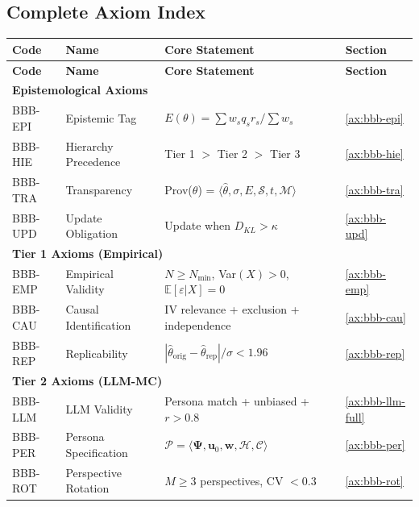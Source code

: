 \documentclass[11pt,a4paper]{article}
\theoremstyle{definition}
\begin{document}

\subsection{Complete Axiom Index}
\label{sec:bbb-axiom-index}

\begin{longtable}{llp{7cm}l}
\toprule
\textbf{Code} & \textbf{Name} & \textbf{Core Statement} & \textbf{Section} \\
\midrule
\endfirsthead
\toprule
\textbf{Code} & \textbf{Name} & \textbf{Core Statement} & \textbf{Section} \\
\midrule
\endhead
\multicolumn{4}{l}{\textbf{Epistemological Axioms}} \\
BBB-EPI & Epistemic Tag & $E(\theta) = \sum w_s q_s r_s / \sum w_s$ & \ref{ax:bbb-epi} \\
BBB-HIE & Hierarchy Precedence & Tier 1 $>$ Tier 2 $>$ Tier 3 & \ref{ax:bbb-hie} \\
BBB-TRA & Transparency & Prov($\theta$) = $\langle \hat{\theta}, \sigma, E, \mathcal{S}, t, \mathcal{M} \rangle$ & \ref{ax:bbb-tra} \\
BBB-UPD & Update Obligation & Update when $D_{KL} > \kappa$ & \ref{ax:bbb-upd} \\
\midrule
\multicolumn{4}{l}{\textbf{Tier 1 Axioms (Empirical)}} \\
BBB-EMP & Empirical Validity & $N \geq N_{\min}$, Var$(X) > 0$, $\mathbb{E}[\varepsilon|X] = 0$ & \ref{ax:bbb-emp} \\
BBB-CAU & Causal Identification & IV relevance + exclusion + independence & \ref{ax:bbb-cau} \\
BBB-REP & Replicability & $|\hat{\theta}_{\text{orig}} - \hat{\theta}_{\text{rep}}| / \sigma < 1.96$ & \ref{ax:bbb-rep} \\
\midrule
\multicolumn{4}{l}{\textbf{Tier 2 Axioms (LLM-MC)}} \\
BBB-LLM & LLM Validity & Persona match + unbiased + $r > 0.8$ & \ref{ax:bbb-llm-full} \\
BBB-PER & Persona Specification & $\mathcal{P} = \langle \boldsymbol{\Psi}, \mathbf{u}_0, \mathbf{w}, \mathcal{H}, \mathcal{C} \rangle$ & \ref{ax:bbb-per} \\
BBB-ROT & Perspective Rotation & $M \geq 3$ perspectives, CV $< 0.3$ & \ref{ax:bbb-rot} \\

\end{longtable}
\end{document}
